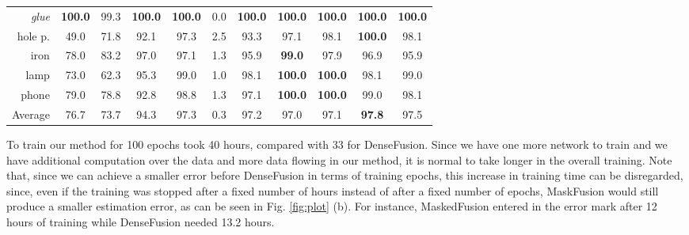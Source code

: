 \documentclass[runningheads]{llncs}
\begin{document}
\begin{table}[thpb]
{\begin{tabular}{r|c|c|c|cc|ccccc}
\multicolumn{1}{r|}{\textit{glue}}      & \textbf{100.0}        & 99.3        & \multicolumn{1}{c|}{\textbf{100.0}}       & \textbf{100.0} & 0.0   & \textbf{100.0}  & \textbf{100.0}  & \textbf{100.0}  & \textbf{100.0}  & \textbf{100.0}  \\
\multicolumn{1}{r|}{hole p.}   & 49.0         & 71.8        & \multicolumn{1}{c|}{92.1}        & 97.3  & 2.5   & 93.3   & 97.1   & 98.1   & \textbf{100.0}  & 98.1   \\
\multicolumn{1}{r|}{iron}      & 78.0         & 83.2        & \multicolumn{1}{c|}{97.0}        & 97.1  & 1.3   & 95.9   & \textbf{99.0}   & 97.9   & 96.9   & 95.9   \\
\multicolumn{1}{r|}{lamp}      & 73.0         & 62.3        & \multicolumn{1}{c|}{95.3}        & 99.0  & 1.0   & 98.1   & \textbf{100.0}  & \textbf{100.0}  & 98.1   & 99.0   \\
\multicolumn{1}{r|}{phone}     & 79.0         & 78.8        & \multicolumn{1}{c|}{92.8}        & 98.8  & 1.3   & 97.1   & \textbf{100.0}  & \textbf{100.0}  & 99.0   & 98.1   \\ \hline
\multicolumn{1}{r|}{Average}   & 76.7         & 73.7        & \multicolumn{1}{c|}{94.3}        & 97.3  & 0.3   & 97.2   & 97.0   & 97.1   & \textbf{97.8}   & 97.5  
\end{tabular}}
\end{table}
To train our method for 100 epochs took 40 hours, compared with 33 for DenseFusion.
Since we have one more network to train and we have additional computation over the data and more data flowing in our method, it is normal to take longer in the overall training.
Note that, since we can achieve a smaller error before DenseFusion in terms of training epochs, this increase in training time can be disregarded, since, even if the training was stopped after a fixed number of hours instead of after a fixed number of epochs, MaskFusion would still produce a smaller estimation error, as can be seen in Fig. \ref{fig:plot} (b).
For instance, MaskedFusion entered in the  error mark after 12 hours of training while DenseFusion needed 13.2 hours.
\end{document}
